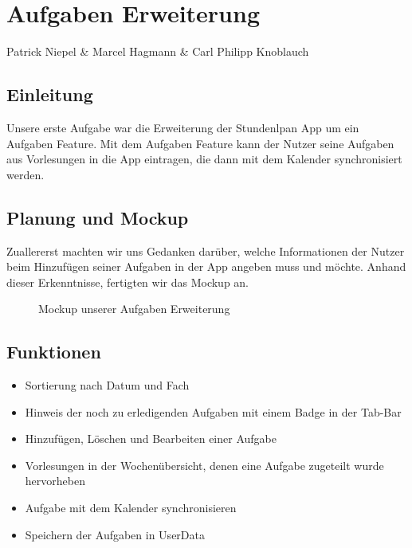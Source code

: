 \chapter{Aufgaben Erweiterung}
Patrick Niepel \& Marcel Hagmann \& Carl Philipp Knoblauch

\section{Einleitung}
Unsere erste Aufgabe war die Erweiterung der Stundenlpan App um ein Aufgaben Feature. Mit dem Aufgaben Feature kann der Nutzer seine Aufgaben aus Vorlesungen in die App eintragen, die dann mit dem Kalender synchronisiert werden.

\newpage
\section{Planung und Mockup}

Zuallererst machten wir uns Gedanken darüber, welche Informationen der Nutzer beim Hinzufügen seiner Aufgaben in der App angeben muss und möchte. Anhand dieser Erkenntnisse, fertigten wir das Mockup an.


\begin{figure}[ht]
	\centering
	\caption{Mockup unserer Aufgaben Erweiterung}
	\label{fig1}
\end{figure}

\newpage
\section{Funktionen}
\begin{itemize}
\item Sortierung nach Datum und Fach
\item Hinweis der noch zu erledigenden Aufgaben mit einem Badge in der Tab-Bar
\item Hinzufügen, Löschen und Bearbeiten einer Aufgabe
\item Vorlesungen in der Wochenübersicht, denen eine Aufgabe zugeteilt wurde hervorheben
\item Aufgabe mit dem Kalender synchronisieren
\item Speichern der Aufgaben in UserData
\end{itemize}



